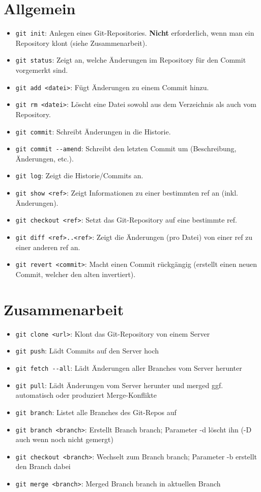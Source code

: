\documentclass[accentcolor=tud8b,colorbacktitle,12pt]{tudexercise}
\begin{document}
\section*{Allgemein}
\begin{itemize}
	\item \lstinline|git init|: Anlegen eines Git-Repositories. \textbf{Nicht} erforderlich, wenn man ein Repository klont (siehe Zusammenarbeit).
	\item \lstinline|git status|: Zeigt an, welche Änderungen im Repository für den Commit vorgemerkt sind.
	\item \lstinline|git add <datei>|: Fügt Änderungen zu einem Commit hinzu.
	\item \lstinline|git rm <datei>|: Löscht eine Datei sowohl aus dem Verzeichnis als auch vom Repository.
	\item \lstinline|git commit|: Schreibt Änderungen in die Historie.
	\item \lstinline|git commit --amend|: Schreibt den letzten Commit um (Beschreibung, Änderungen, etc.).
	\item \lstinline|git log|: Zeigt die Historie/Commits an.
	\item \lstinline|git show <ref>|: Zeigt Informationen zu einer bestimmten ref an (inkl. Änderungen).
	\item \lstinline|git checkout <ref>|: Setzt das Git-Repository auf eine bestimmte ref.
	\item \lstinline|git diff <ref>..<ref>|: Zeigt die Änderungen (pro Datei) von einer ref zu einer anderen ref an.
	\item \lstinline|git revert <commit>|: Macht einen Commit rückgängig (erstellt einen neuen Commit, welcher den alten invertiert).
\end{itemize}

\section*{Zusammenarbeit}
\begin{itemize}
	\label{CollabClone}
	\item \lstinline|git clone <url>|: Klont das Git-Repository von einem Server
	\item \lstinline|git push|: Lädt Commits auf den Server hoch
	\item \lstinline|git fetch --all|: Lädt Änderungen aller Branches vom Server herunter
	\item \lstinline|git pull|: Lädt Änderungen vom Server herunter und merged ggf. automatisch oder produziert Merge-Konflikte
	\item \lstinline|git branch|: Listet alle Branches des Git-Repos auf
	\item \lstinline|git branch <branch>|: Erstellt Branch branch; Parameter -d löscht ihn (-D auch wenn noch nicht gemergt)
	\item \lstinline|git checkout <branch>|: Wechselt zum Branch branch; Parameter -b erstellt den Branch dabei
	\item \lstinline|git merge <branch>|: Merged Branch branch in aktuellen Branch
\end{itemize}
\end{document}
